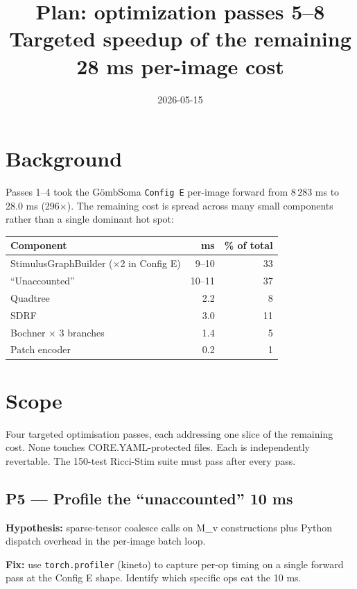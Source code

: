 \documentclass[11pt,a4paper]{article}
\title{Plan: \GS{} optimization passes 5--8\\
       \large{Targeted speedup of the remaining 28 ms per-image cost}}
\date{2026-05-15}
\author{}
\newcommand{\GS}{G\"ombSoma}
\begin{document}
\maketitle

\section{Background}

Passes 1--4 took the \GS{} \texttt{Config E} per-image forward from
8\,283 ms to 28.0 ms (296$\times$). The remaining cost is spread
across many small components rather than a single dominant hot spot:

\begin{center}
\begin{tabular}{lrr}
\toprule
Component                       & ms    & \% of total \\
\midrule
StimulusGraphBuilder (×2 in Config E) & 9--10 & 33 \\
``Unaccounted''                  & 10--11 & 37 \\
Quadtree                         & 2.2   & 8 \\
SDRF                             & 3.0   & 11 \\
Bochner × 3 branches             & 1.4   & 5 \\
Patch encoder                    & 0.2   & 1 \\
\bottomrule
\end{tabular}
\end{center}

\section{Scope}

Four targeted optimisation passes, each addressing one slice of the
remaining cost. None touches CORE.YAML-protected files. Each is
independently revertable. The 150-test Ricci-Stim suite must pass
after every pass.

\subsection{P5 --- Profile the ``unaccounted'' 10 ms}

\textbf{Hypothesis:} sparse-tensor coalesce calls on M\_v constructions
plus Python dispatch overhead in the per-image batch loop.

\textbf{Fix:} use \texttt{torch.profiler} (kineto) to capture per-op
timing on a single forward pass at the Config E shape. Identify which
specific ops eat the 10 ms.
\end{document}
